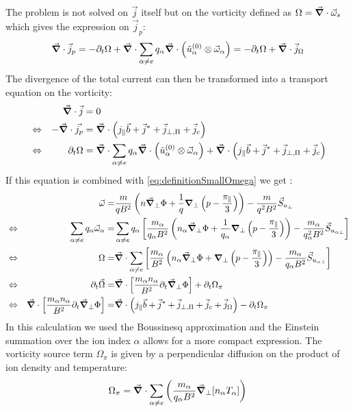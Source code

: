  The problem is not solved on $\vec{j}$ itself but on the vorticity defined as $\Omega = \vec{\grad}\cdot\vec{\omega}_s$ which gives the expression on $\vec{j}_p$: 
 $$ \vec{\grad}\cdot\vec{j}_p = -\partial_t\Omega + \vec{\grad}\cdot\sum_{\alpha\neq e}q_\alpha\vec{\grad}\cdot\left(\tilde{u}^{(0)}_\alpha\otimes\vec{\omega}_\alpha\right) = - \partial_t\Omega + \vec{\grad}\cdot\vec{j}_\Omega $$
The divergence of the total current can then be transformed into a transport equation on the vorticity:
 \begin{align}
 	&& \vec{\grad}\cdot\vec{j} &= 0 \nonumber \\
 	&\Leftrightarrow& -\vec{\grad}\cdot\vec{j_p} &= \vec{\grad}\cdot\left(j_\parallel\vec{b} + \vec{j}^* + \vec{j}_{\perp,\Pi} + \vec{j}_{c} \right) \nonumber \\
 	&\Leftrightarrow& \partial_t\Omega &= \vec{\grad}\cdot\sum_{\alpha\neq e}q_\alpha\vec{\grad}\cdot\left(\tilde{u}^{(0)}_\alpha\otimes\vec{\omega}_\alpha\right) +\vec{\grad}\cdot\left(j_\parallel\vec{b} + \vec{j}^* + \vec{j}_{\perp,\Pi} + \vec{j}_{c} \right)
 	\label{eq:TransportEquationVorticity}
 \end{align}
If this equation is combined with \autoref{eq:definitionSmallOmega} we get :
 \begin{align}
 	&& \vec{\omega} =& \frac{m}{qB^2}\left(n\vec{\grad}_\perp\Phi + \frac{1}{q}\grad_{\perp}\left(p-\frac{\pi_\parallel}{3}\right)\right) - \frac{m}{q^2B^2}\vec{S}_{u_\perp} \nonumber\\
	&\Leftrightarrow& \sum_{\alpha\neq e}q_\alpha\vec{\omega}_\alpha =& \sum_{\alpha\neq e}q_\alpha\left[\frac{m_\alpha}{q_\alpha B^2}\left(n_\alpha\vec{\grad}_\perp\Phi + \frac{1}{q_\alpha}\grad_{\perp}\left(p-\frac{\pi_\parallel}{3}\right)\right) - \frac{m_\alpha}{q_\alpha^2B^2}\vec{S}_{u_{\alpha\perp}}\right] \nonumber\\
	&\Leftrightarrow& \Omega =& \vec{\grad}\cdot\sum_{\alpha\neq e}\left[\frac{m_\alpha}{ B^2}\left(n_\alpha\vec{\grad}_\perp\Phi + \grad_{\perp}\left(p-\frac{\pi_\parallel}{3}\right)\right) - \frac{m_\alpha}{q_\alpha B^2}\vec{S}_{u_{\alpha\perp}}\right] \nonumber \\
	&\Leftrightarrow& \partial_t\vec{\Omega} =& \vec{\grad}\cdot\left[\frac{m_\alpha n_\alpha}{ B^2}\partial_t\vec{\grad}_\perp\Phi\right] + \partial_t \Omega_\pi \nonumber \\
	&\Leftrightarrow& \vec{\grad}\cdot\left[\frac{m_\alpha n_\alpha}{ B^2}\partial_t\vec{\grad}_\perp\Phi\right]  =&  \vec{\grad}\cdot\left(j_\parallel\vec{b} + \vec{j}^* + \vec{j}_{\perp,\Pi} + \vec{j}_{c} + \vec{j}_\Omega\right) - \partial_t \Omega_\pi \label{eq:FirstFormVorticityEquation}
 \end{align}
 In this calculation we used the Boussinesq approximation and the Einstein summation over the ion index $\alpha$ allows for a more compact expression. The vorticity source term $\Omega_\pi$ is given by a perpendicular diffusion on the product of ion density and temperature:
 $$ \Omega_\pi = \vec{\grad}\cdot\sum_{\alpha\neq e}\left(\frac{m_\alpha}{q_\alpha B^2}\vec{\grad}_\perp[n_\alpha T_\alpha]\right)$$


